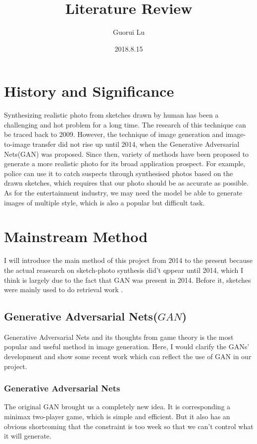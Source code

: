 \documentclass{article}
\title{Literature Review}
\author{Guorui Lu}
\date{2018.8.15}
\begin{document}
\maketitle

\section{History and Significance}
 
\indent Synthesizing realistic photo from sketches drawn by human has been a challenging and hot problem for a long time. The research of this technique can be traced back to 2009\cite{Chen2009Sketch2Photo}. However, the technique of image generation and image-to-image transfer did not rise up until 2014, when the Generative Adversarial Nets(GAN)\cite{Goodfellow2014Generative} was proposed. Since then, variety of methods have been proposed to generate a more realistic photo for its broad application prospect. For example, police can use it to catch suspects through synthesised photos based on the drawn sketches, which requires that our photo should be as accurate as possible. As for the entertainment industry, we may need the model be able to generate images of multiple style, which is also a popular but difficult task.

\section{Mainstream Method}
\indent I will introduce the main method of this project from 2014 to the present because the actual reasearch on sketch-photo synthesis did't qppear until 2014, which I think is largely due to the fact that GAN \cite{Goodfellow2014Generative} was present in 2014. Before it, sketches were mainly used to do retrieval work \cite{Cao2010MindFinder, Eitz2010An, Hu2010Gradient, Wang2010MindFinder, Cao2011Edgel, Hu2011A, Hu2013A, Lin20143D}.


\subsection{Generative Adversarial Nets($GAN$)}
Generative Adversarial Nets and its thoughts from game theory is the most popular and useful method in image generation. Here, I would clarify the GANs' development and show some recent work which can reflect the use of GAN in our project.




\subsubsection{Generative Adversarial Nets}
\indent The original GAN brought us a completely new idea. It is corresponding a minimax two-player game, which is simple and efficient. But it also has an obvious shortcoming that the constraint is too week so that we can't control what it will generate.
\end{document}
